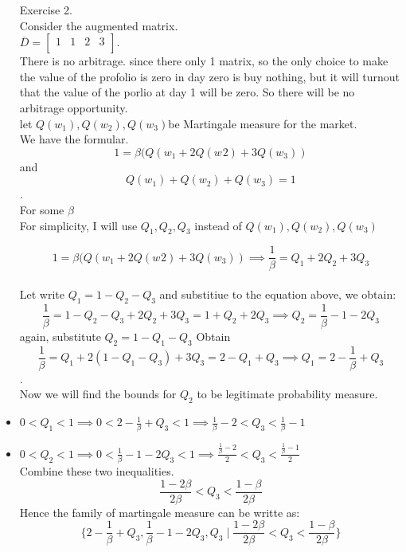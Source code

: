 \documentclass[12pt]{article}
\newcommand{\ol}{\overline}
\begin{document}
\begin{itemize}
Exercise 2.\\
 Consider the augmented matrix.\\
 
  $\ol{D}=
    \left[\begin{array}{llll}
    1 & 1 & 2 & 3\\
    \end{array}
    \right].$ 
    \\
    
    There is no arbitrage. since there only 1 matrix, so the only choice to make the value of the profolio is zero in day zero is buy nothing, but it will turnout that the value of the porlio at day 1 will be zero. So there will be no arbitrage opportunity.\\
    
    let $Q(w_{1}), Q(w_{2}), Q(w_{3})$be Martingale measure for the market.\\
    We have the formular.\\
    
    $$1 = \beta(Q(w_{1}+2Q(w_{}{2})+3Q(w_{3}))$$ and\\ 
 



$$Q(w_{1}) +  Q(w_{2})+ Q(w_{3}) = 1$$. \\ 
For some $\beta$\\
For simplicity, I will use $Q_{1}, Q_{2}, Q_{3}$ instead of $Q(w_{1}), Q(w_{2}), Q(w_{3})$

$$1 = \beta(Q(w_{1}+2Q(w_{}{2})+3Q(w_{3})) \implies \frac{1}{\beta} = Q_{1} + 2 Q_{2} +3 Q_{3}$$\\
Let write $Q_{1} = 1-Q_{2}-Q_{3}$ and substitiue to the equation above, we obtain:\\
$$\frac{1}{\beta} = 1-Q_{2}-Q_{3} + 2 Q_{2} +3 Q_{3} = 1+Q_{2}+2Q_{3} \implies Q_{2} =\frac{1}{\beta} - 1 - 2Q_{3} $$
again, substitute $Q_{2} = 1-Q_{1}-Q_{3}$ Obtain\\
$$\frac{1}{\beta} = Q_{1} + 2(1-Q_{1}-Q_{3}) +3 Q_{3}  = 2-Q_{1}+Q_{3} \implies Q_{1} = 2-\frac{1}{\beta}+Q_{3}$$.\\ Now we will find the bounds for $Q_{2}$ to be legitimate probability measure.

\item $0<Q_{1}<1 \implies 0<2-\frac{1}{\beta}+Q_{3}<1 \implies \frac{1}{\beta} -2 < Q_{3} < \frac{1}{\beta} - 1$
\item $0<Q_{2}<1 \implies 0<\frac{1}{\beta} - 1 - 2Q_{3} <1 \implies \frac{\frac{1}{\beta} - 2}{2} < Q_{3}<\frac{\frac{1}{\beta}-1}{2}$\\
Combine these two inequalities.\\ 
$$\frac{1-2\beta}{2\beta} < Q_{3}<\frac{1-\beta}{2\beta}$$
Hence the family of martingale measure can be writte as:\\
$$\{2-\frac{1}{\beta}+Q_{3},\frac{1}{\beta} - 1 - 2Q_{3} ,Q_{3} \mid \frac{1-2\beta}{2\beta} < Q_{3}<\frac{1-\beta}{2\beta} \}$$



\end{itemize}
\end{document}
